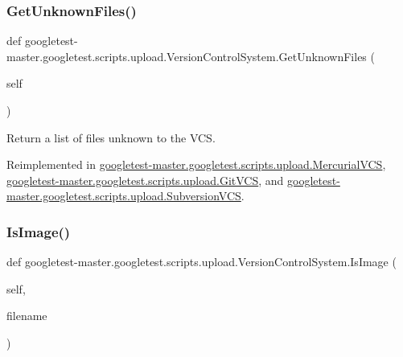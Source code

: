 \subsubsection{\texorpdfstring{GetUnknownFiles()}{GetUnknownFiles()}}
{\footnotesize\ttfamily def googletest-\/master.\+googletest.\+scripts.\+upload.\+Version\+Control\+System.\+Get\+Unknown\+Files (\begin{DoxyParamCaption}\item[{}]{self }\end{DoxyParamCaption})}

\begin{DoxyVerb}Return a list of files unknown to the VCS.\end{DoxyVerb}
 

Reimplemented in \mbox{\hyperlink{classgoogletest-master_1_1googletest_1_1scripts_1_1upload_1_1_mercurial_v_c_s_a16c601bb13f3ae9b6f54239969f37095}{googletest-\/master.\+googletest.\+scripts.\+upload.\+Mercurial\+V\+CS}}, \mbox{\hyperlink{classgoogletest-master_1_1googletest_1_1scripts_1_1upload_1_1_git_v_c_s_afa90a5cfd1b4f217422384f4e1d3b004}{googletest-\/master.\+googletest.\+scripts.\+upload.\+Git\+V\+CS}}, and \mbox{\hyperlink{classgoogletest-master_1_1googletest_1_1scripts_1_1upload_1_1_subversion_v_c_s_a626e361b781f4403b60fcf00a129a92a}{googletest-\/master.\+googletest.\+scripts.\+upload.\+Subversion\+V\+CS}}.

\mbox{\label{classgoogletest-master_1_1googletest_1_1scripts_1_1upload_1_1_version_control_system_a9e2b84e5f6e6e24c337f88d4ae84c773}} 
\subsubsection{\texorpdfstring{IsImage()}{IsImage()}}
{\footnotesize\ttfamily def googletest-\/master.\+googletest.\+scripts.\+upload.\+Version\+Control\+System.\+Is\+Image (\begin{DoxyParamCaption}\item[{}]{self,  }\item[{}]{filename }\end{DoxyParamCaption})}

